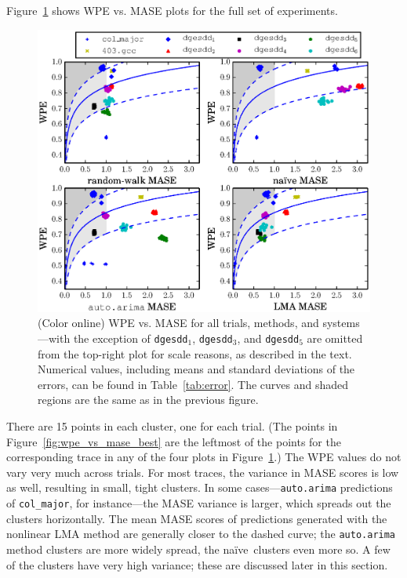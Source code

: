 \documentclass[%
pre,
reprint,
superscriptaddress,
showpacs,
nofootinbib,
nobibnotes,
 amsmath,amssymb,
 aps,
]{revtex4-1}
\newcommand{\svdone}{{\tt dgesdd}$_1$\xspace}
\newcommand{\svdthree}{{\tt dgesdd$_3$}\xspace}
\newcommand{\svdfive}{{\tt dgesdd$_5$}\xspace}
\newcommand{\arima}{{\tt auto.arima}\xspace}
\newcommand{\naive}{na\"ive}
\begin{document}
Figure~\ref{fig:wpe_vs_mase_all} shows WPE vs. MASE plots for the full
set of experiments.
\begin{figure}
  \centering
  \includegraphics[width=1.7\columnwidth]{new_predictions_vs_entropy4a}
\caption{(Color online) WPE vs. MASE for all trials, methods, and systems---with the
  exception of \svdone, \svdthree, and \svdfive are omitted from the
  top-right plot for scale reasons, as described in the text.
%
%
Numerical values, including means and standard deviations of the
errors, can be found in Table~\ref{tab:error}.  The curves and shaded
regions are the same as in the previous figure.  }
    \label{fig:wpe_vs_mase_all}
\end{figure}
There are 15 points in each cluster, one for each trial.  (The points
in Figure~\ref{fig:wpe_vs_mase_best} are the leftmost of the points
for the corresponding trace in any of the four plots in
Figure~\ref{fig:wpe_vs_mase_all}.)  The WPE values do not vary very
much across trials.  For most traces, the variance in MASE scores is
low as well, resulting in small, tight clusters.  In some
cases---\arima predictions of {\tt col\_major}, for instance---the
MASE variance is larger, which spreads out the clusters horizontally.
The mean MASE scores of predictions generated with the nonlinear LMA
method are generally closer to the dashed curve; the \arima method
clusters are more widely spread, the \naive ~clusters even more so.  A
few of the clusters have very high variance; these are discussed later
in this section.
\end{document}
